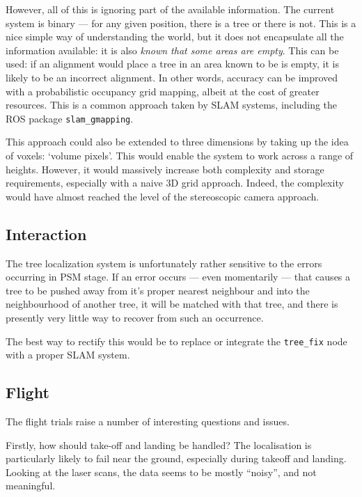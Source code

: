 \documentclass[12pt,oneside,a4paper]{book}
\begin{document}
However, all of this is ignoring part of the available
information. The current system is binary --- for any given position,
there is a tree or there is not. This is a nice simple way of
understanding the world, but it does not encapsulate all the
information available: it is also \emph{known that some areas are
  empty}. This can be used: if an alignment would place a tree in an
area known to be is empty, it is likely to be an incorrect
alignment. In other words, accuracy can be improved with a
probabilistic occupancy grid mapping, albeit at the cost of greater
resources. This is a common approach taken by SLAM systems, including
the ROS package \texttt{slam\_gmapping}.

This approach could also be extended to three dimensions by taking up
the idea of voxels: `volume pixels'. This would enable the system to
work across a range of heights. However, it would massively increase
both complexity and storage requirements, especially with a naive 3D
grid approach. Indeed, the complexity would have almost reached the
level of the stereoscopic camera approach.


\subsection{Interaction}
\label{sec:interaction}

The tree localization system is unfortunately rather sensitive to the
errors occurring in PSM stage. If an error occurs --- even momentarily
--- that causes a tree to be pushed away from it's proper nearest
neighbour and into the neighbourhood of another tree, it will be
matched with that tree, and there is presently very little way to
recover from such an occurrence.

The best way to rectify this would be to replace or integrate the
\texttt{tree\_fix} node with a proper SLAM system.

\subsection{Flight}
\label{sec:flight}

The flight trials raise a number of interesting questions and issues.

Firstly, how should take-off and landing be handled? The localisation
is particularly likely to fail near the ground, especially during
takeoff and landing. Looking at the laser scans, the data seems to be
mostly ``noisy'', and not meaningful.
\end{document}
